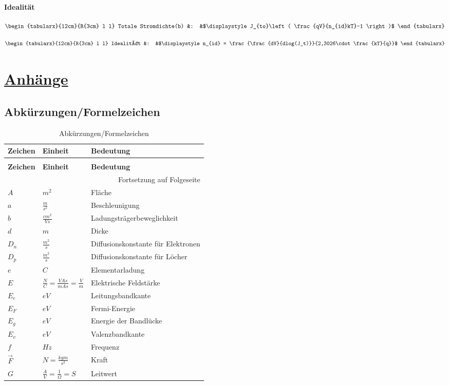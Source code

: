 \documentclass[12pt,a4paper]{article}%
\numberwithin{equation}{section}
\newcommand{\subsubsubsection}{\paragraph}
\def\brac#1{\left( #1 \right)}
\def\formTab#1#2{
\begin{equation}
  \begin{tabularx}{12cm}{R{3cm} l l}
    #1 &: &$#2$
  \end{tabularx}
\end{equation}
}
\numberwithin{equation}{subsection}
\begin{document}
  \subsubsubsection{Idealität}
  \formTab{Totale Stromdichte(b)}{\displaystyle J_{to}\brac{\frac{qV}{n_{id}kT}-1}}
  \formTab{Idealität}{\displaystyle n_{id} = \frac{\frac{dV}{dlog(J_t)}}{2,3026\cdot \frac{kT}{q}}}
  
  \newpage
\section{\underline{Anhänge}}
	\subsection{Abkürzungen/Formelzeichen} \label{ch:names}
	\renewcommand{\arraystretch}{1.5}
	\begin{longtable} {|p{2cm}|p{3cm}|p{8.4cm}|} \hline
	\textbf{Zeichen} & \textbf{Einheit} & \textbf{Bedeutung} \\
	\hline
	\endfirsthead %
	\caption{Abkürzungen/Formelzeichen}\\ \hline
	\textbf{Zeichen} & \textbf{Einheit} & \textbf{Bedeutung} \\
	\hline
	\endhead %
	\multicolumn{3}{r}{Fortsetzung auf Folgeseite}\\
	\endfoot
	\hline
	\endlastfoot
	
	$A$ & $m^2$ & Fläche \\ \hline
	$a$ & $\frac{m}{s^2}$ & Beschleunigung \\ \hline
	$b$ & $\frac{cm^2}{Vs}$ & Ladungsträgerbeweglichkeit \\ \hline
	$d$ & $m$ & Dicke \\ \hline
	$D_n$ & $\frac{m^2}{s}$ & Diffusionskonstante für Elektronen \\ \hline
	$D_p$ & $\frac{m^2}{s}$ & Diffusionskonstante für Löcher \\ \hline
	$e$ & $C$ & Elementarladung \\ \hline
	$E$ & $\frac{N}{C} = \frac{VAs}{mAs} = \frac{V}{m}$ & Elektrische Feldstärke \\ \hline
	$E_c$ & $eV$ & Leitungsbandkante \\ \hline
	$E_F$ & $eV$ & Fermi-Energie \\ \hline
	$E_g$ & $eV$ & Energie der Bandlücke \\ \hline
	$E_v$ & $eV$ & Valenzbandkante \\ \hline
	$f$ & $Hz$ & Frequenz \\ \hline
	$\vec{F}$ & $N = \frac{kgm}{s^2}$ & Kraft \\ \hline
	$G$ & $\frac{A}{V} = \frac{1}{\Omega} = S$ & Leitwert \\ \hline
	

\end{longtable}
\end{document}
